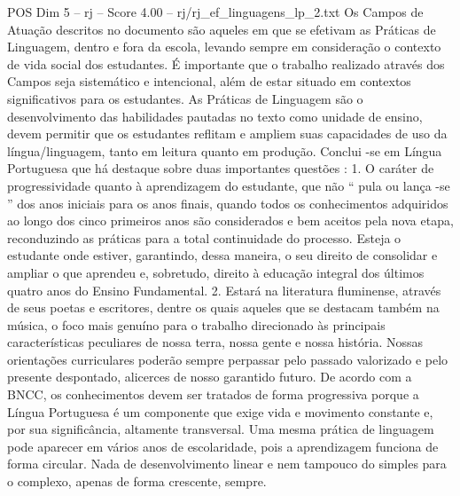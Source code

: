 \begin{textsample}{POS Dim 5 – rj – Score 4.00 – rj/rj\_ef\_linguagens\_lp\_2.txt}
Os Campos de Atuação descritos no documento são aqueles em que se efetivam as Práticas de Linguagem, dentro e fora da escola, levando sempre em consideração o contexto de vida social dos estudantes.
É importante que o trabalho realizado através dos Campos seja sistemático e intencional, além de estar situado em contextos significativos para os estudantes.
As Práticas de Linguagem são o desenvolvimento das habilidades pautadas no texto como unidade de ensino, devem permitir que os estudantes reflitam e ampliem suas capacidades de uso da língua/linguagem, tanto em leitura quanto em produção.
Conclui -se em Língua Portuguesa que há destaque sobre duas importantes questões : 1.
O caráter de progressividade quanto à aprendizagem do estudante, que não “ pula ou lança -se ” dos anos iniciais para os anos finais, quando todos os conhecimentos adquiridos ao longo dos cinco primeiros anos são considerados e bem aceitos pela nova etapa, reconduzindo as práticas para a total continuidade do processo.
Esteja o estudante onde estiver, garantindo, dessa maneira, o seu direito de consolidar e ampliar o que aprendeu e, sobretudo, direito à educação integral dos últimos quatro anos do Ensino Fundamental. 2.
Estará na literatura fluminense, através de seus poetas e escritores, dentre os quais aqueles que se destacam também na música, o foco mais genuíno para o trabalho direcionado às principais características peculiares de nossa terra, nossa gente e nossa história.
Nossas orientações curriculares poderão sempre perpassar pelo passado valorizado e pelo presente despontado, alicerces de nosso garantido futuro.
De acordo com a BNCC, os conhecimentos devem ser tratados de forma progressiva porque a Língua Portuguesa é um componente que exige vida e movimento constante e, por sua significância, altamente transversal.
Uma mesma prática de linguagem pode aparecer em vários anos de escolaridade, pois a aprendizagem funciona de forma circular.
Nada de desenvolvimento linear e nem tampouco do simples para o complexo, apenas de forma crescente, sempre.

\end{textsample}
